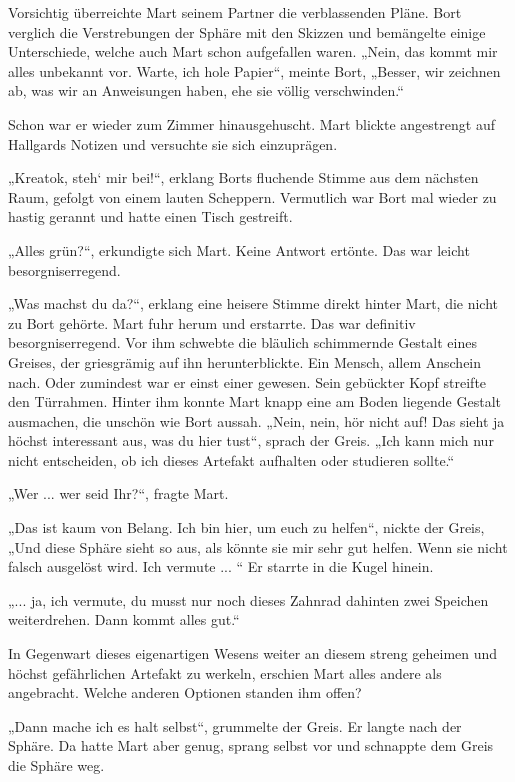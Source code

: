 \documentclass[10pt, a4paper, oneside]{book}
\begin{document}
Vorsichtig überreichte Mart seinem Partner die verblassenden Pläne. Bort verglich die Verstrebungen der Sphäre mit den Skizzen und bemängelte einige Unterschiede, welche auch Mart schon aufgefallen waren. „Nein, das kommt mir alles unbekannt vor. Warte, ich hole Papier“, meinte Bort, „Besser, wir zeichnen ab, was wir an Anweisungen haben, ehe sie völlig verschwinden.“

Schon war er wieder zum Zimmer hinausgehuscht. Mart blickte angestrengt auf Hallgards Notizen und versuchte sie sich einzuprägen. \bigskip

„Kreatok, steh‘ mir bei!“, erklang Borts fluchende Stimme aus dem nächsten Raum, gefolgt von einem lauten Scheppern. Vermutlich war Bort mal wieder zu hastig gerannt und hatte einen Tisch gestreift. 

„Alles grün?“, erkundigte sich Mart. Keine Antwort ertönte. Das war leicht besorgniserregend.

„Was machst du da?“, erklang eine heisere Stimme direkt hinter Mart, die nicht zu Bort gehörte. Mart fuhr herum und erstarrte. Das war definitiv besorgniserregend. Vor ihm schwebte die bläulich schimmernde Gestalt eines Greises, der griesgrämig auf ihn herunterblickte. Ein Mensch, allem Anschein nach. Oder zumindest war er einst einer gewesen. Sein gebückter Kopf streifte den Türrahmen. Hinter ihm konnte Mart knapp eine am Boden liegende Gestalt ausmachen, die unschön wie Bort aussah. „Nein, nein, hör nicht auf! Das sieht ja höchst interessant aus, was du hier tust“, sprach der Greis. „Ich kann mich nur nicht entscheiden, ob ich dieses Artefakt aufhalten oder studieren sollte.“ 

„Wer ... wer seid Ihr?“, fragte Mart.

„Das ist kaum von Belang. Ich bin hier, um euch zu helfen“, nickte der Greis, „Und diese Sphäre sieht so aus, als könnte sie mir sehr gut helfen. Wenn sie nicht falsch ausgelöst wird. Ich vermute ...
“
Er starrte in die Kugel hinein.

„... ja, ich vermute, du musst nur noch dieses Zahnrad dahinten zwei Speichen weiterdrehen. Dann kommt alles gut.“ 

In Gegenwart dieses eigenartigen Wesens weiter an diesem streng geheimen und höchst gefährlichen Artefakt zu werkeln, erschien Mart alles andere als angebracht. Welche anderen Optionen standen ihm offen? 

„Dann mache ich es halt selbst“, grummelte der Greis. Er langte nach der Sphäre. Da hatte Mart aber genug, sprang selbst vor und schnappte dem Greis die Sphäre weg.
\end{document}
